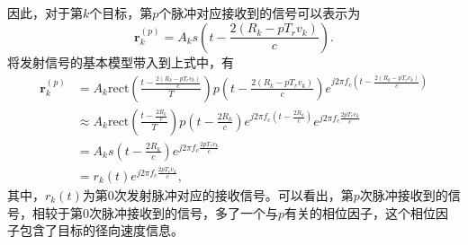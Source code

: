 因此，对于第\( k \)个目标，第\( p \)个脉冲对应接收到的信号可以表示为
\[
    \bm{r}_k^{(p)} = A_k s\left(t - \frac{2 (R_k - p T_r v_k)}{c}\right).
\]
将发射信号的基本模型带入到上式中，有
\[
    \begin{split}
        \bm{r}_k^{(p)} & = A_k \text{rect}\left(\frac{t - \frac{2 (R_k - p T_r v_k)}{c}}{T}\right) p\left(t - \frac{2 (R_k - p T_r v_k)}{c}\right) e^{j 2 \pi f_c \left(t - \frac{2 (R_k - p T_r v_k)}{c}\right)}   \\
                       & \approx A_k \text{rect}\left(\frac{t - \frac{2 R_k}{c}}{T}\right) p\left(t - \frac{2 R_k}{c}\right) e^{j 2 \pi f_c \left(t - \frac{2 R_k}{c}\right)} e^{j 2 \pi f_c \frac{2 p T_r v_k}{c}} \\
                       & = A_k s\left(t - \frac{2 R_k}{c}\right) e^{j 2 \pi f_c \frac{2 p T_r v_k}{c}}                                                                                                              \\
                       & = r_k(t) e^{j 2 \pi f_c \frac{2 p T_r v_k}{c}},
    \end{split}
\]
其中，\( r_k(t) \)为第0次发射脉冲对应的接收信号。可以看出，第\( p \)次脉冲接收到的信号，相较于第0次脉冲接收到的信号，多了一个与\( p \)有关的相位因子，这个相位因子包含了目标的径向速度信息。


